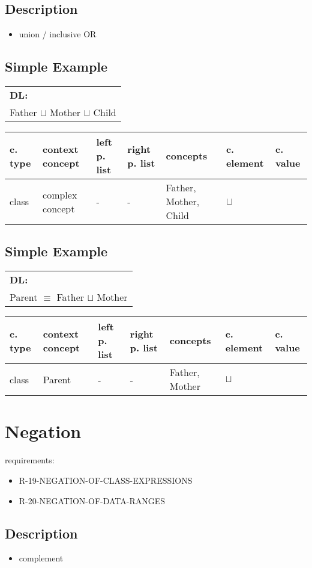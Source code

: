 \documentclass{llncs}
\newenvironment{gcotable}{
  \scriptsize
  \sffamily
  \vspace{0.3cm}
  \begin{tabular}{l|l|l|l|l|l|l}
  \hline
  \textbf{c. type} & \textbf{context concept} & \textbf{left p. list} & \textbf{right p. list} & \textbf{concepts} & \textbf{c. element} & \textbf{c. value} \\
  \hline

}{
  \hline
  \end{tabular}
  \linebreak
}
\newenvironment{DL}{
  \scriptsize
  \sffamily
  \vspace{0.3cm}
  \begin{tabular}{l}
	\textbf{DL:} \\

}{
  \end{tabular}
  \linebreak
}
\begin{document}
\subsection{Description}

\begin{itemize}
	\item union / inclusive OR
\end{itemize}

\subsection{Simple Example}

\begin{DL}
Father $\sqcup$ Mother $\sqcup$ Child
\end{DL}

\begin{gcotable}
class & complex concept & - & - & Father, Mother, Child & $\sqcup$ \\
\end{gcotable}

\subsection{Simple Example}

\begin{DL}
Parent $\equiv$ Father $\sqcup$ Mother
\end{DL}

\begin{gcotable}
class & Parent & - & - & Father, Mother & $\sqcup$ \\
\end{gcotable}

\section{Negation}

requirements:

\begin{itemize}
  \item R-19-NEGATION-OF-CLASS-EXPRESSIONS
	\item R-20-NEGATION-OF-DATA-RANGES
\end{itemize}

\subsection{Description}

\begin{itemize}
	\item complement
\end{itemize}
\end{document}
